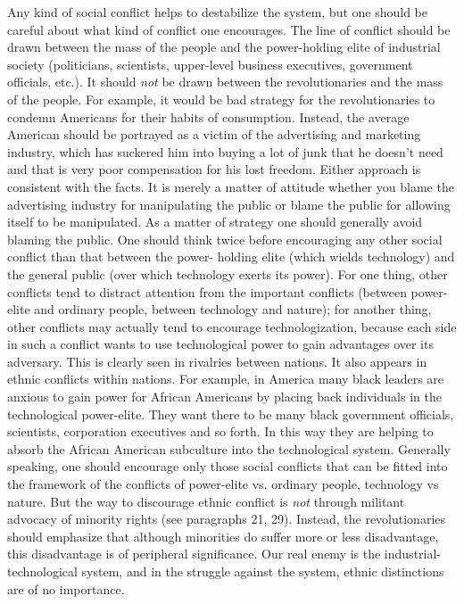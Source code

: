  Any kind of social conflict helps to destabilize the system, but one should be careful about what kind of conflict one encourages. The line of conflict should be drawn between the mass of the people and the power-holding elite of industrial society (politicians, scientists, upper-level business executives, government officials, etc.). It should {\em not} be drawn between the revolutionaries and the mass of the people. For example, it would be bad strategy for the revolutionaries to condemn Americans for their habits of consumption. Instead, the average American should be portrayed as a victim of the advertising and marketing industry, which has suckered him into buying a lot of junk that he doesn’t need and that is very poor compensation for his lost freedom. Either approach is consistent with the facts. It is merely a matter of attitude whether you blame the advertising industry for manipulating the public or blame the public for allowing itself to be manipulated. As a matter of strategy one should generally avoid blaming the public.
 One should think twice before encouraging any other social conflict than that between the power- holding elite (which wields technology) and the general public (over which technology exerts its power). For one thing, other conflicts tend to distract attention from the important conflicts (between power-elite and ordinary people, between technology and nature); for another thing, other conflicts may actually tend to encourage technologization, because each side in such a conflict wants to use technological power to gain advantages over its adversary. This is clearly seen in rivalries between nations. It also appears in ethnic conflicts within nations. For example, in America many black leaders are anxious to gain power for African Americans by placing back individuals in the technological power-elite. They want there to be many black government officials, scientists, corporation executives and so forth. In this way they are helping to absorb the African American subculture into the technological system. Generally speaking, one should encourage only those social conflicts that can be fitted into the framework of the conflicts of power-elite vs. ordinary people, technology vs nature.
 But the way to discourage ethnic conflict is {\em not} through militant advocacy of minority rights (see paragraphs 21, 29). Instead, the revolutionaries should emphasize that although minorities do suffer more or less disadvantage, this disadvantage is of peripheral significance. Our real enemy is the industrial- technological system, and in the struggle against the system, ethnic distinctions are of no importance.
